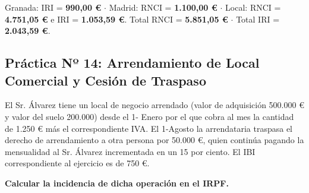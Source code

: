\documentclass[11pt,a4paper,openany]{article}
\begin{document}
\begin{resultadoBox}
Granada: IRI = \textbf{990,00 \euro} $\cdot$ Madrid: RNCI = \textbf{1.100,00 \euro} $\cdot$ Local: RNCI = \textbf{4.751,05 \euro} e IRI = \textbf{1.053,59 \euro}. Total RNCI = \textbf{5.851,05 \euro} $\cdot$ Total IRI = \textbf{2.043,59 \euro}.
\end{resultadoBox}

\vspace{0.4cm}

\subsection{Práctica Nº 14: Arrendamiento de Local Comercial y Cesión de Traspaso}

\begin{enunciadoBox}
El Sr. Álvarez tiene un local de negocio arrendado (valor de adquisición 500.000 \euro{} y valor del suelo 200.000) desde el 1- Enero por el que cobra al mes la cantidad de 1.250 \euro{} más el correspondiente IVA. El 1-Agosto la arrendataria traspasa el derecho de arrendamiento a otra persona por 50.000 \euro{}, quien continúa pagando la mensualidad al Sr. Álvarez incrementada en un 15 por ciento. El IBI correspondiente al ejercicio es de 750 \euro{}.

\textbf{Calcular la incidencia de dicha operación en el IRPF.}
\end{enunciadoBox}
\end{document}

